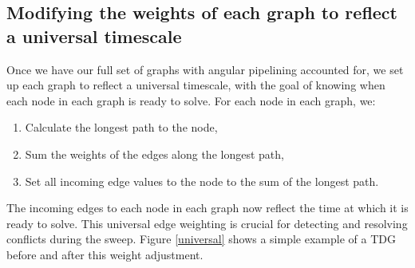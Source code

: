\subsection{Modifying the weights of each graph to reflect a universal timescale}\label{sec:universal}

Once we have our full set of graphs with angular pipelining accounted for, we set up each graph to reflect a universal timescale, with the goal of knowing when each node in each graph is ready to solve. 
For each node in each graph, we:
\begin{enumerate}
  \item Calculate the longest path to the node,
  \item Sum the weights of the edges along the longest path,
  \item Set all incoming edge values to the node to the sum of the longest path. 
\end{enumerate}
The incoming edges to each node in each graph now reflect the time at which it is ready to solve. This universal edge weighting is crucial for detecting and resolving conflicts during the sweep. Figure \ref{universal} shows a simple example of a TDG before and after this weight adjustment.
